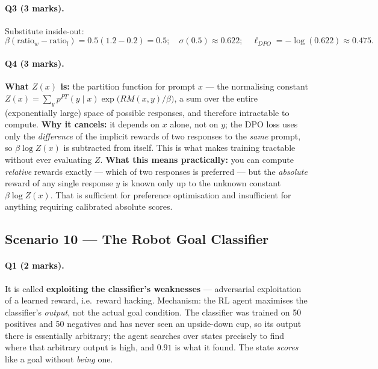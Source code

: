 \documentclass[11pt,a4paper]{article}
\begin{document}
\paragraph{Q3 (3 marks).} Substitute inside-out:
\[
\beta(\text{ratio}_w-\text{ratio}_l)=0.5(1.2-0.2)=0.5;\quad
\sigma(0.5)\approx 0.622;\quad
\ell_{DPO}=-\log(0.622)\approx \mathbf{0.475}.
\]

\paragraph{Q4 (3 marks).}
\textbf{What $Z(x)$ is:} the partition function for prompt $x$ --- the
normalising constant
$Z(x)=\sum_y p^{PT}(y\mid x)\exp\bigl(RM(x,y)/\beta\bigr)$, a sum over the
entire (exponentially large) space of possible responses, and therefore
intractable to compute.
\textbf{Why it cancels:} it depends on $x$ alone, not on $y$; the DPO loss
uses only the \emph{difference} of the implicit rewards of two responses to
the \emph{same} prompt, so $\beta\log Z(x)$ is subtracted from itself. This
is what makes training tractable without ever evaluating $Z$.
\textbf{What this means practically:} you can compute \emph{relative} rewards
exactly --- which of two responses is preferred --- but the \emph{absolute}
reward of any single response $y$ is known only up to the unknown constant
$\beta\log Z(x)$. That is sufficient for preference optimisation and
insufficient for anything requiring calibrated absolute scores.

\subsection{Scenario 10 --- The Robot Goal Classifier}

\paragraph{Q1 (2 marks).} It is called \textbf{exploiting the classifier's
weaknesses} --- adversarial exploitation of a learned reward, i.e.\ reward
hacking. Mechanism: the RL agent maximises the classifier's \emph{output},
not the actual goal condition. The classifier was trained on 50 positives and
50 negatives and has never seen an upside-down cup, so its output there is
essentially arbitrary; the agent searches over states precisely to find where
that arbitrary output is high, and $0.91$ is what it found. The state
\emph{scores} like a goal without \emph{being} one.
\end{document}
